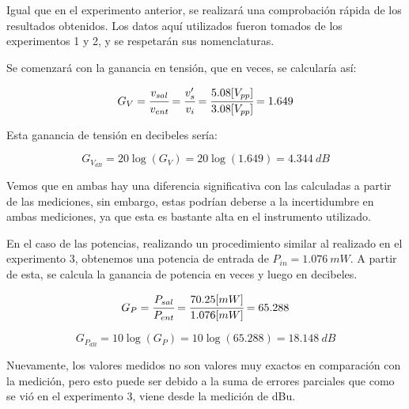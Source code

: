 Igual que en el experimento anterior, se realizará una comprobación rápida de los resultados obtenidos. Los datos aquí utilizados fueron tomados de los experimentos 1 y 2, y se respetarán sus nomenclaturas.

Se comenzará con la ganancia en tensión, que en veces, se calcularía así:

\begin{equation*}
    G_V = \cfrac{v_{sal}}{v_{ent}} = \cfrac{v_s'}{v_i} = \cfrac{5.08 [V_{pp}]}{3.08 [V_{pp}]} = 1.649 
\end{equation*}

Esta ganancia de tensión en decibeles sería:

\begin{equation*}
    G_{V_{dB}} = 20 \log (G_V) = 20 \log (1.649) = 4.344 ~dB 
\end{equation*}

Vemos que en ambas hay una diferencia significativa con las calculadas a partir de las mediciones, sin embargo, estas podrían deberse a la incertidumbre en ambas mediciones, ya que esta es bastante alta en el instrumento utilizado.

En el caso de las potencias, realizando un procedimiento similar al realizado en el experimento 3, obtenemos una potencia de entrada de $P_{in}=1.076~mW$. A partir de esta, se calcula la ganancia de potencia en veces y luego en decibeles.

\begin{equation*}
    G_P = \cfrac{P_{sal}}{P_{ent}} = \cfrac{70.25 [mW]}{1.076 [mW]} = 65.288
\end{equation*}

\begin{equation*}
    G_{P_{dB}} = 10 \log (G_P) = 10 \log (65.288) = 18.148 ~dB
\end{equation*}

Nuevamente, los valores medidos no son valores muy exactos en comparación con la medición, pero esto puede ser debido a la suma de errores parciales que como se vió en el experimento 3, viene desde la medición de dBu.


